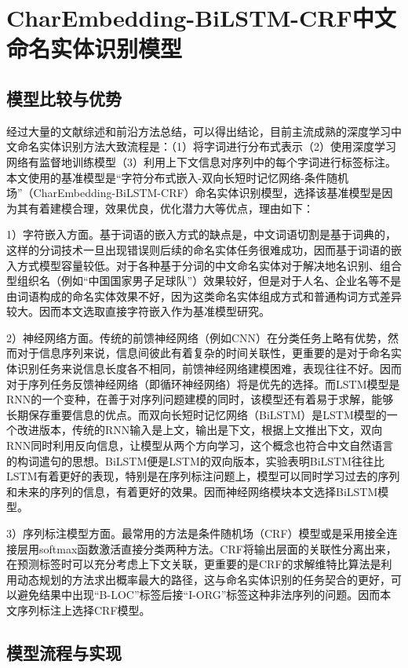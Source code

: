 \documentclass[winfonts,master,oneside,nobackinfo]{njuthesis}
\begin{document}
\section{CharEmbedding-BiLSTM-CRF中文命名实体识别模型}

\subsection{模型比较与优势}
经过大量的文献综述和前沿方法总结，可以得出结论，目前主流成熟的深度学习中文命名实体识别方法大致流程是：（1）将字词进行分布式表示（2）使用深度学习网络有监督地训练模型（3）利用上下文信息对序列中的每个字词进行标签标注。本文使用的基准模型是“字符分布式嵌入-双向长短时记忆网络-条件随机场”（CharEmbedding-BiLSTM-CRF）命名实体识别模型，选择该基准模型是因为其有着建模合理，效果优良，优化潜力大等优点，理由如下：

1）字符嵌入方面。基于词语的嵌入方式的缺点是，中文词语切割是基于词典的，这样的分词技术一旦出现错误则后续的命名实体任务很难成功，因而基于词语的嵌入方式模型容量较低。对于各种基于分词的中文命名实体对于解决地名识别、组合型组织名（例如“中国国家男子足球队”）效果较好，但是对于人名、企业名等不是由词语构成的命名实体效果不好，因为这类命名实体组成方式和普通构词方式差异较大。因而本文选取直接字符嵌入作为基准模型研究。

2）神经网络方面。传统的前馈神经网络（例如CNN）在分类任务上略有优势，然而对于信息序列来说，信息间彼此有着复杂的时间关联性，更重要的是对于命名实体识别任务来说信息长度各不相同，前馈神经网络建模困难，表现往往不好。因而对于序列任务反馈神经网络（即循环神经网络）将是优先的选择。而LSTM模型是RNN的一个变种，在善于对序列问题建模的同时，该模型还有着易于求解，能够长期保存重要信息的优点。而双向长短时记忆网络（BiLSTM）是LSTM模型的一个改进版本，传统的RNN输入是上文，输出是下文，根据上文推出下文，双向RNN同时利用反向信息，让模型从两个方向学习，这个概念也符合中文自然语言的构词遣句的思想。BiLSTM便是LSTM的双向版本，实验表明BiLSTM往往比LSTM有着更好的表现\cite{Graves}，特别是在序列标注问题上，模型可以同时学习过去的序列和未来的序列的信息，有着更好的效果\cite{Huang}。因而神经网络模块本文选择BiLSTM模型。

3）序列标注模型方面。最常用的方法是条件随机场（CRF）模型或是采用接全连接层用softmax函数激活直接分类两种方法。CRF将输出层面的关联性分离出来，在预测标签时可以充分考虑上下文关联，更重要的是CRF的求解维特比算法是利用动态规划的方法求出概率最大的路径，这与命名实体识别的任务契合的更好，可以避免结果中出现“B-LOC”标签后接“I-ORG”标签这种非法序列的问题。因而本文序列标注上选择CRF模型。

\subsection{模型流程与实现}
\end{document}

